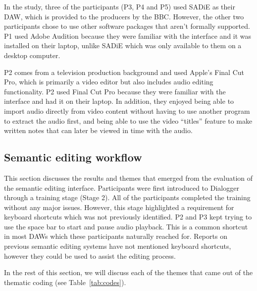 In the study, three of the participants (P3, P4 and P5) used SADiE as their DAW, which is provided to the producers by
the BBC. However, the other two participants chose to use other software packages that aren't formally supported. P1
used Adobe Audition because they were familiar with the interface and it was installed on their laptop, unlike SADiE
which was only available to them on a desktop computer.

P2 comes from a television production background and used Apple's Final Cut Pro, which is primarily a video editor but
also includes audio editing functionality.  P2 used Final Cut Pro because they were familiar with the interface and had
it on their laptop. In addition, they enjoyed being able to import audio directly from video content without having to
use another program to extract the audio first, and being able to use the video ``titles'' feature to make written notes
that can later be viewed in time with the audio.

\subsection{Semantic editing workflow}\label{sec:resultsnew}
This section discusses the results and themes that emerged from the evaluation of the semantic editing interface.
Participants were first introduced to Dialogger through a training stage (Stage 2). All of the
participants completed the training without any major issues. However, this stage highlighted a requirement for
keyboard shortcuts which was not previously identified.  P2 and P3 kept trying to use the space bar to start and pause
audio playback. This is a common shortcut in most DAWs which these participants naturally reached for. Reports on
previous semantic editing systems have not mentioned keyboard shortcuts, however they could be used to assist the
editing process.

In the rest of this section, we will discuss each of the themes that came out of the thematic coding (see Table~\ref{tab:codes}).




